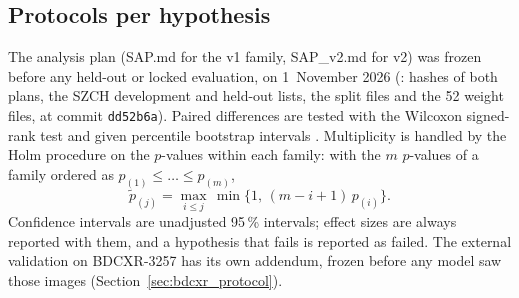 \subsection{Protocols per hypothesis}
The analysis plan (SAP.md for the v1 family, SAP\_v2.md for v2) was frozen before any held-out or locked evaluation, on 1~November 2026
(: hashes of both plans, the SZCH development and held-out lists, the split files and the 52 weight files, at commit
\texttt{dd52b6a}). Paired differences are tested with the Wilcoxon signed-rank test \citep{wilcoxon1945individual} and given percentile bootstrap intervals
\citep{efron1993bootstrap}. Multiplicity is handled by the Holm procedure \citep{holm1979simple} on the $p$-values within each family: with
the $m$ $p$-values of a family ordered as $p_{(1)}\le\dots\le p_{(m)}$,
\begin{equation}
\tilde p_{(j)}=\max_{i\le j}\,\min\big\{1,\,(m-i+1)\,p_{(i)}\big\}.
\label{eq:holm}
\end{equation}
Confidence intervals are unadjusted 95\,\% intervals; effect sizes are always reported with them, and a hypothesis that fails is reported as failed. The external validation on
BDCXR-3257 has its own addendum, frozen before any model saw those images (Section~\ref{sec:bdcxr_protocol}).
